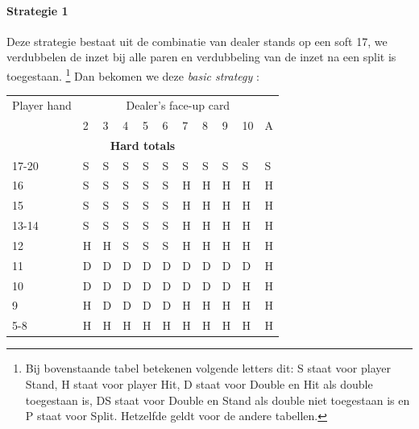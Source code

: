 \documentclass[conference]{IEEEtran}
\begin{document}
\paragraph{Strategie 1}

Deze strategie bestaat uit de combinatie van dealer stands op een soft 17, we verdubbelen de inzet bij alle paren en verdubbeling van de inzet na een split is toegestaan. \footnote{ Bij bovenstaande tabel betekenen volgende letters dit: S staat voor player Stand, H staat voor player Hit, D staat voor Double en Hit als double toegestaan is, DS staat voor Double en Stand als double niet toegestaan is en P staat voor Split. Hetzelfde geldt voor de andere tabellen.}
Dan bekomen we deze \textit{basic strategy} :

\begin{table}[ht]
\tiny
\centering
\begin{tabular}{|l|l|l|l|l|l|l|l|l|l|l|}
\hline

{Player hand} & \multicolumn{10}{c|}{Dealer's face-up card}     \\ \cline{2-11} 
                             & 2 & 3 & 4 & 5 & 6 & 7 & 8 & 9 & 10 & A \\ \hline
\multicolumn{11}{|c|}{\textbf{Hard totals}}                           \\ \hline
17-20       								 & S & S & S & S & S & S & S & S & S & S  \\ \hline
16                           & S & S & S & S & S & H & H & H & H & H  \\ \hline
15                           & S & S & S & S & S & H & H & H & H & H  \\ \hline
13-14                        & S & S & S & S & S & H & H & H & H & H  \\ \hline
12                           & H & H & S & S & S & H & H & H & H & H  \\ \hline
11                           & D & D & D & D & D & D & D & D & D & H  \\ \hline
10                           & D & D & D & D & D & D & D & D & H & H  \\ \hline
9                            & H & D & D & D & D & H & H & H & H & H  \\ \hline
5-8                          & H & H & H & H & H & H & H & H & H & H  \\ \hline


\end{tabular}
\end{table}
\end{document}
